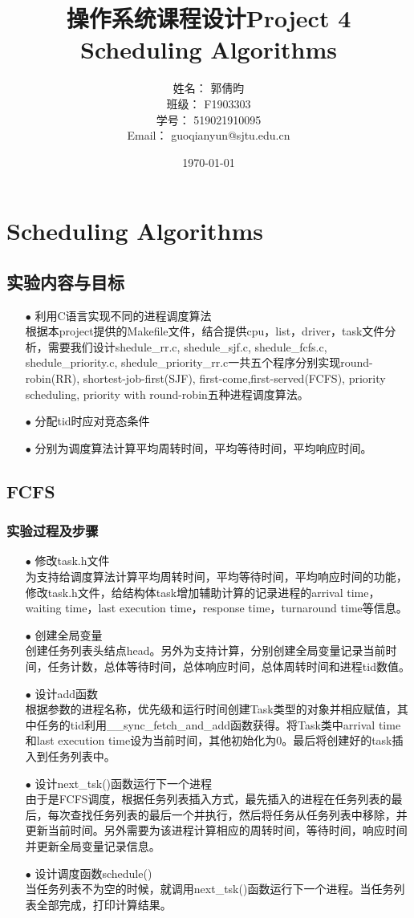 \documentclass{article}
\title{\textbf{操作系统课程设计Project 4\\Scheduling Algorithms}} %
\author{姓名： 郭倩昀  
\\班级： F1903303  
\\学号： 519021910095  
\\Email： guoqianyun@sjtu.edu.cn} %
\date{\today} %
\begin{document}
\maketitle %
\tableofcontents
\section{Scheduling Algorithms}
\subsection{实验内容与目标}
\begin{itemize}
\item[$\bullet$]利用C语言实现不同的进程调度算法\\
根据本project提供的Makefile文件，结合提供cpu，list，driver，task文件分析，需要我们设计shedule\_rr.c, shedule\_sjf.c, shedule\_fcfs.c, shedule\_priority.c, shedule\_priority\_rr.c一共五个程序分别实现round-robin(RR), shortest-job-first(SJF), first-come,first-served(FCFS), priority scheduling, priority with round-robin五种进程调度算法。
\item[$\bullet$]分配tid时应对竞态条件
\item[$\bullet$]分别为调度算法计算平均周转时间，平均等待时间，平均响应时间。
\end{itemize}
\subsection{FCFS}
\subsubsection{实验过程及步骤}
\begin{itemize}
\item[$\bullet$]修改task.h文件\\
为支持给调度算法计算平均周转时间，平均等待时间，平均响应时间的功能，修改task.h文件，给结构体task增加辅助计算的记录进程的arrival time，waiting time，last execution time，response time，turnaround time等信息。
\item[$\bullet$]创建全局变量\\
创建任务列表头结点head。另外为支持计算，分别创建全局变量记录当前时间，任务计数，总体等待时间，总体响应时间，总体周转时间和进程tid数值。
\item[$\bullet$]设计add函数\\
根据参数的进程名称，优先级和运行时间创建Task类型的对象并相应赋值，其中任务的tid利用\_\_sync\_fetch\_and\_add函数获得。将Task类中arrival time和last execution time设为当前时间，其他初始化为0。最后将创建好的task插入到任务列表中。
\item[$\bullet$]设计next\_tsk()函数运行下一个进程\\
由于是FCFS调度，根据任务列表插入方式，最先插入的进程在任务列表的最后，每次查找任务列表的最后一个并执行，然后将任务从任务列表中移除，并更新当前时间。另外需要为该进程计算相应的周转时间，等待时间，响应时间并更新全局变量记录信息。
\item[$\bullet$]设计调度函数schedule()\\
当任务列表不为空的时候，就调用next\_tsk()函数运行下一个进程。当任务列表全部完成，打印计算结果。
\end{itemize}
\end{document}
